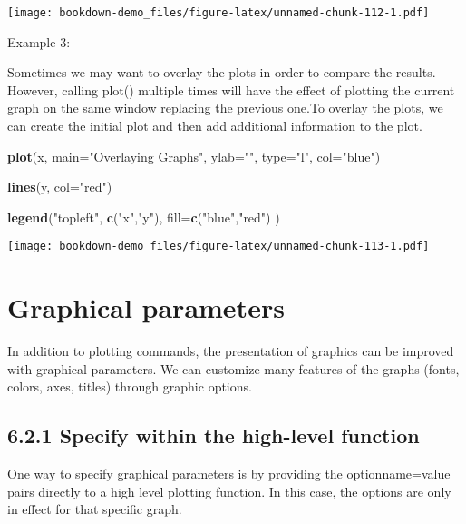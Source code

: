 \documentclass[]{book}
\newenvironment{Shaded}{\begin{snugshade}}{\end{snugshade}}
\newcommand{\KeywordTok}[1]{\textcolor[rgb]{0.13,0.29,0.53}{\textbf{#1}}}
\newcommand{\DataTypeTok}[1]{\textcolor[rgb]{0.13,0.29,0.53}{#1}}
\newcommand{\StringTok}[1]{\textcolor[rgb]{0.31,0.60,0.02}{#1}}
\newcommand{\NormalTok}[1]{#1}
\theoremstyle{definition}
\theoremstyle{definition}
\theoremstyle{definition}
\theoremstyle{remark}
\begin{document}
\texttt{[image: bookdown-demo\_files/figure-latex/unnamed-chunk-112-1.pdf]}

Example 3:

Sometimes we may want to overlay the plots in order to compare the
results. However, calling plot() multiple times will have the effect of
plotting the current graph on the same window replacing the previous
one.To overlay the plots, we can create the initial plot and then add
additional information to the plot.

\begin{Shaded}
\begin{Highlighting}[]
\KeywordTok{plot}\NormalTok{(x, }
 \DataTypeTok{main=}\StringTok{"Overlaying Graphs"}\NormalTok{,}
 \DataTypeTok{ylab=}\StringTok{""}\NormalTok{,}
 \DataTypeTok{type=}\StringTok{"l"}\NormalTok{,}
 \DataTypeTok{col=}\StringTok{"blue"}\NormalTok{)}

\KeywordTok{lines}\NormalTok{(y, }\DataTypeTok{col=}\StringTok{"red"}\NormalTok{)}

\KeywordTok{legend}\NormalTok{(}\StringTok{"topleft"}\NormalTok{,}
      \KeywordTok{c}\NormalTok{(}\StringTok{"x"}\NormalTok{,}\StringTok{"y"}\NormalTok{),}
      \DataTypeTok{fill=}\KeywordTok{c}\NormalTok{(}\StringTok{"blue"}\NormalTok{,}\StringTok{"red"}\NormalTok{)}
\NormalTok{)}
\end{Highlighting}
\end{Shaded}

\texttt{[image: bookdown-demo\_files/figure-latex/unnamed-chunk-113-1.pdf]}

\section{Graphical parameters}\label{graphical-parameters}

In addition to plotting commands, the presentation of graphics can be
improved with graphical parameters. We can customize many features of
the graphs (fonts, colors, axes, titles) through graphic options.

\subsection{6.2.1 Specify within the high-level
function}\label{specify-within-the-high-level-function}

One way to specify graphical parameters is by providing the
optionname=value pairs directly to a high level plotting function. In
this case, the options are only in effect for that specific graph.
\end{document}
